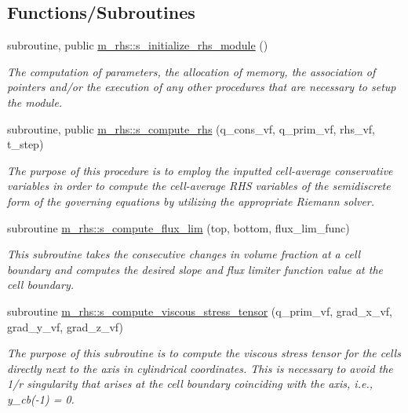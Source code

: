 \subsection*{Functions/\+Subroutines}
\begin{DoxyCompactItemize}
\item 
subroutine, public \hyperlink{namespacem__rhs_ae6f7edb814859919c5d1f739574155bd}{m\+\_\+rhs\+::s\+\_\+initialize\+\_\+rhs\+\_\+module} ()
\begin{DoxyCompactList}\small\item\em The computation of parameters, the allocation of memory, the association of pointers and/or the execution of any other procedures that are necessary to setup the module. \end{DoxyCompactList}\item 
subroutine, public \hyperlink{namespacem__rhs_a361f0038973069452cc88430c49bcfe8}{m\+\_\+rhs\+::s\+\_\+compute\+\_\+rhs} (q\+\_\+cons\+\_\+vf, q\+\_\+prim\+\_\+vf, rhs\+\_\+vf, t\+\_\+step)
\begin{DoxyCompactList}\small\item\em The purpose of this procedure is to employ the inputted cell-\/average conservative variables in order to compute the cell-\/average R\+HS variables of the semidiscrete form of the governing equations by utilizing the appropriate Riemann solver. \end{DoxyCompactList}\item 
subroutine \hyperlink{namespacem__rhs_aa8bc1b17f230cbd06b702f34bd199ef1}{m\+\_\+rhs\+::s\+\_\+compute\+\_\+flux\+\_\+lim} (top, bottom, flux\+\_\+lim\+\_\+func)
\begin{DoxyCompactList}\small\item\em This subroutine takes the consecutive changes in volume fraction at a cell boundary and computes the desired slope and flux limiter function value at the cell boundary. \end{DoxyCompactList}\item 
subroutine \hyperlink{namespacem__rhs_a2da1b596b26740b8edff160297676447}{m\+\_\+rhs\+::s\+\_\+compute\+\_\+viscous\+\_\+stress\+\_\+tensor} (q\+\_\+prim\+\_\+vf, grad\+\_\+x\+\_\+vf, grad\+\_\+y\+\_\+vf, grad\+\_\+z\+\_\+vf)
\begin{DoxyCompactList}\small\item\em The purpose of this subroutine is to compute the viscous stress tensor for the cells directly next to the axis in cylindrical coordinates. This is necessary to avoid the 1/r singularity that arises at the cell boundary coinciding with the axis, i.\+e., y\+\_\+cb(-\/1) = 0. \end{DoxyCompactList}\item 

\end{DoxyCompactItemize}
